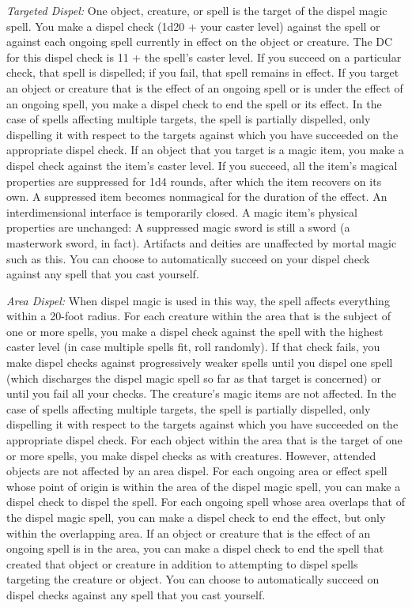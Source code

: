 \begin{list}{}{\leftmargin=1em}
 \item \emph{Targeted Dispel:} One object, creature, or spell is the target of the dispel magic spell. 
You make a dispel check (1d20 + your caster level) against the spell or against each ongoing spell currently in effect on the object or creature. 
The DC for this dispel check is 11 + the spell's caster level. 
If you succeed on a particular check, that spell is dispelled; if you fail, that spell remains in effect.
If you target an object or creature that is the effect of an ongoing spell or is under the effect of an ongoing spell, you make a dispel check to end the spell or its effect.
In the case of spells affecting multiple targets, the spell is partially dispelled, only dispelling it with respect to the targets against which you have succeeded on the appropriate dispel check.
If an object that you target is a magic item, you make a dispel check against the item's caster level. 
If you succeed, all the item's magical properties are suppressed for 1d4 rounds, after which the item recovers on its own. A suppressed item becomes nonmagical for the duration of the effect.
An interdimensional interface is temporarily closed.
A magic item's physical properties are unchanged:
A suppressed magic sword is still a sword (a masterwork sword, in fact). 
Artifacts and deities are unaffected by mortal magic such as this.
You can choose to automatically succeed on your dispel check against any spell that you cast yourself.

\item \emph{Area Dispel:} When dispel magic is used in this way, the spell affects everything within a 20-foot radius. 
For each creature within the area that is the subject of one or more spells, you make a dispel check against the spell with the highest caster level (in case multiple spells fit, roll randomly). 
If that check fails, you make dispel checks against progressively weaker spells until you dispel one spell (which discharges the dispel magic spell so far as that target is concerned) or until you fail all your checks. 
The creature's magic items are not affected.
In the case of spells affecting multiple targets, the spell is partially dispelled, only dispelling it with respect to the targets against which you have succeeded on the appropriate dispel check.
For each object within the area that is the target of one or more spells, you make dispel checks as with creatures. 
However, attended objects are not affected by an area dispel.
For each ongoing area or effect spell whose point of origin is within the area of the dispel magic spell, you can make a dispel check to dispel the spell.
For each ongoing spell whose area overlaps that of the dispel magic spell, you can make a dispel check to end the effect, but only within the overlapping area.
If an object or creature that is the effect of an ongoing spell is in the area, you can make a dispel check to end the spell that created that object or creature 
in addition to attempting to dispel spells targeting the creature or object. 
You can choose to automatically succeed on dispel checks against any spell that you cast yourself.
\end{list}


